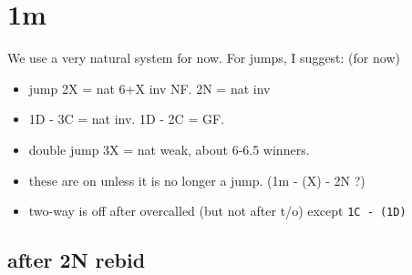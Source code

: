 \section{1m}

We use a very natural system for now. For jumps, I suggest: (for now)
\begin{itemize}
    \setlength\itemsep{0pt}
    \item jump 2X = nat 6+X inv NF. 2N = nat inv
    \item 1D - 3C = nat inv. 1D - 2C = GF.
    \item double jump 3X = nat weak, about 6-6.5 winners.
    \item these are on unless it is no longer a jump. (1m - (X) - 2N ?)
    \item two-way is off after overcalled (but not after t/o) except \texttt{1C - (1D)}
\end{itemize}

\subsection{after 2N rebid}

